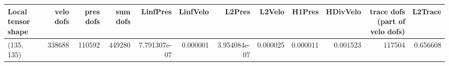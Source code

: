 \begin{tabular}{lrrrrrrrrrrr}
\toprule
Local tensor shape &  velo dofs &  pres dofs &  sum dofs &     LinfPres &  LinfVelo &       L2Pres &   L2Velo &   H1Pres &  HDivVelo &  trace dofs (part of velo dofs) &  L2Trace \\
\midrule
        (135, 135) &     338688 &     110592 &    449280 & 7.791307e-07 &  0.000001 & 3.954084e-07 & 0.000025 & 0.000011 &  0.001523 &                          117504 & 0.656608 \\
\bottomrule
\end{tabular}
